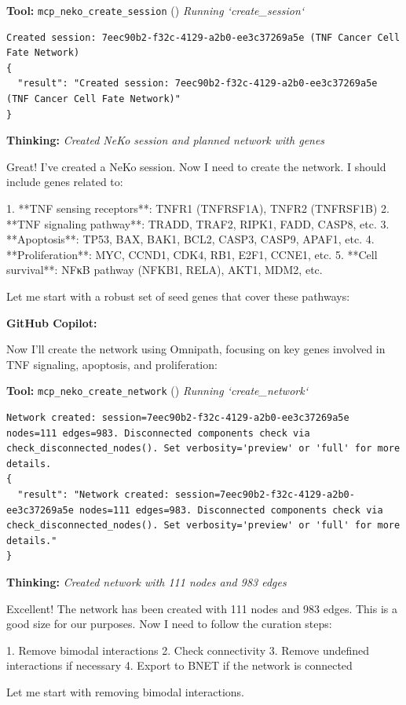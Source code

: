 \documentclass[11pt,a4paper]{article}
\begin{document}
\begin{toolokbox}
\textbf{Tool:} \texttt{mcp\_neko\_create\_session} (\checkmark)
\textit{Running `create\_session`}
\begin{lstlisting}
Created session: 7eec90b2-f32c-4129-a2b0-ee3c37269a5e (TNF Cancer Cell Fate Network)
{
  "result": "Created session: 7eec90b2-f32c-4129-a2b0-ee3c37269a5e (TNF Cancer Cell Fate Network)"
}
\end{lstlisting}
\end{toolokbox}
\begin{thinkbox}
\textbf{Thinking:} \textit{Created NeKo session and planned network with genes}

Great! I've created a NeKo session. Now I need to create the network. I should include genes related to:

1. **TNF sensing receptors**: TNFR1 (TNFRSF1A), TNFR2 (TNFRSF1B)
2. **TNF signaling pathway**: TRADD, TRAF2, RIPK1, FADD, CASP8, etc.
3. **Apoptosis**: TP53, BAX, BAK1, BCL2, CASP3, CASP9, APAF1, etc.
4. **Proliferation**: MYC, CCND1, CDK4, RB1, E2F1, CCNE1, etc.
5. **Cell survival**: NFκB pathway (NFKB1, RELA), AKT1, MDM2, etc.

Let me start with a robust set of seed genes that cover these pathways:

\end{thinkbox}
\begin{copilotbox}
\textbf{GitHub Copilot:}

Now I'll create the network using Omnipath, focusing on key genes involved in TNF signaling, apoptosis, and proliferation:

\end{copilotbox}
\begin{toolokbox}
\textbf{Tool:} \texttt{mcp\_neko\_create\_network} (\checkmark)
\textit{Running `create\_network`}
\begin{lstlisting}
Network created: session=7eec90b2-f32c-4129-a2b0-ee3c37269a5e nodes=111 edges=983. Disconnected components check via check_disconnected_nodes(). Set verbosity='preview' or 'full' for more details.
{
  "result": "Network created: session=7eec90b2-f32c-4129-a2b0-ee3c37269a5e nodes=111 edges=983. Disconnected components check via check_disconnected_nodes(). Set verbosity='preview' or 'full' for more details."
}
\end{lstlisting}
\end{toolokbox}
\begin{thinkbox}
\textbf{Thinking:} \textit{Created network with 111 nodes and 983 edges}

Excellent! The network has been created with 111 nodes and 983 edges. This is a good size for our purposes. Now I need to follow the curation steps:

1. Remove bimodal interactions
2. Check connectivity
3. Remove undefined interactions if necessary
4. Export to BNET if the network is connected

Let me start with removing bimodal interactions.

\end{thinkbox}
\end{document}
